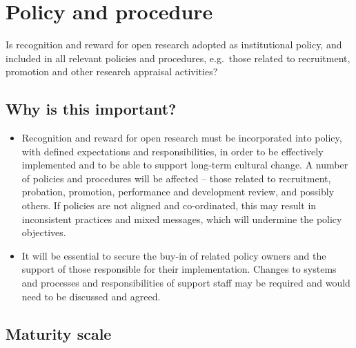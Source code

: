 \documentclass[
  letterpaper,
  DIV=11,
  numbers=noendperiod,
  oneside]{scrreprt}
\begin{document}

\chapter{Policy and procedure}\label{policy-and-procedure}

\begin{tcolorbox}[enhanced jigsaw, colback=white, toprule=.15mm, colframe=quarto-callout-color-frame, arc=.35mm, opacityback=0, bottomrule=.15mm, breakable, left=2mm, leftrule=.75mm, rightrule=.15mm]

Is recognition and reward for open research adopted as institutional
policy, and included in all relevant policies and procedures, e.g.~those
related to recruitment, promotion and other research appraisal
activities?

\end{tcolorbox}

\section{Why is this important?}\label{why-is-this-important-4}

\begin{itemize}
\item
  Recognition and reward for open research must be incorporated into
  policy, with defined expectations and responsibilities, in order to be
  effectively implemented and to be able to support long-term cultural
  change. A number of policies and procedures will be affected -- those
  related to recruitment, probation, promotion, performance and
  development review, and possibly others. If policies are not aligned
  and co-ordinated, this may result in inconsistent practices and mixed
  messages, which will undermine the policy objectives.
\item
  It will be essential to secure the buy-in of related policy owners and
  the support of those responsible for their implementation. Changes to
  systems and processes and responsibilities of support staff may be
  required and would need to be discussed and agreed.
\end{itemize}

\section{Maturity scale}\label{maturity-scale-4}
\end{document}
